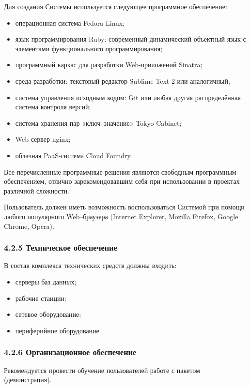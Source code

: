 Для создания Системы используется следующее программное
обеспечение:
\begin{itemize}
  \item операционная система Fedora Linux;
  \item язык программирования Ruby: современный динамический
объектный язык с элементами функционального программирования;
  \item программный каркас для разработки Web-приложений Sinatra;
  \item среда разработки: текстовый редактор Sublime Text 2 или
аналогичный;
  \item система управления исходным кодом: Git или любая другая
распределённая система контроля версий;
  \item система хранения пар «ключ--значение» Tokyo Cabinet;
  \item Web-сервер nginx;
  \item облачная PaaS-система Cloud Foundry.
\end{itemize}

Все перечисленные программные решения являются свободным программным
обеспечением, отлично зарекомендовавшим себя при использовании в
проектах различной сложности.

Пользователь должен иметь возможность воспользоваться Системой
при помощи любого популярного Web--браузера (Internet Explorer,
Mozilla Firefox, Google Chrome, Opera).

\subsubsection*{4.2.5 Техническое обеспечение}
В состав комплекса технических средств должны входить:
\begin{itemize}
  \item серверы баз данных;
  \item рабочие станции;
  \item сетевое оборудование;
  \item периферийное оборудование.
\end{itemize}

\subsubsection*{4.2.6 Организационное обеспечение}
Рекомендуется провести обучение пользователей работе с
пакетом (демонстрация).

